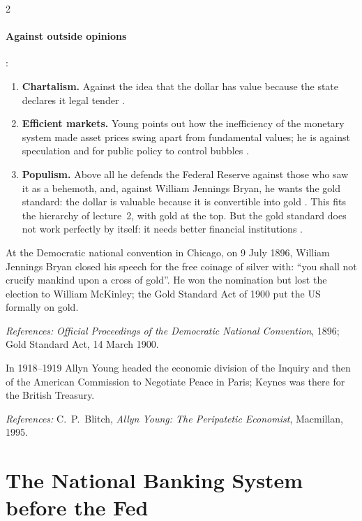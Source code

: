 \begin{paracol}{2}
\paragraph{Against outside opinions} :
\begin{enumerate}[resume]
  \item \textbf{Chartalism.} Against the idea that the dollar has value because the state declares it legal tender
        .
  \item \textbf{Efficient markets.} Young points out how the inefficiency of the monetary system made asset prices swing apart from
        fundamental values; he is against speculation and for public policy to control bubbles .
  \item \textbf{Populism.} Above all he defends the Federal Reserve against those who saw it as a behemoth, and, against William
        Jennings Bryan, he wants the gold standard: the dollar is valuable because it is convertible into gold
        . This fits the hierarchy of lecture~2, with gold at the top. But the gold
        standard does not work perfectly by itself: it needs better financial institutions .
\end{enumerate}\Needspace*{10.5cm}\begin{history}
At the Democratic national convention in Chicago, on 9 July 1896, William Jennings Bryan closed his speech for the free coinage
of silver with: ``you shall not crucify mankind upon a cross of gold''. He won the nomination but lost the election to William
McKinley; the Gold Standard Act of 1900 put the US formally on gold.\par
\emph{References:} \emph{Official Proceedings of the Democratic National Convention}, 1896; Gold Standard Act, 14 March 1900.
\end{history}\begin{history}
In 1918--1919 Allyn Young headed the economic division of the Inquiry and then of the American Commission to Negotiate Peace
in Paris; Keynes was there for the British Treasury.\par
\emph{References:} C.~P.~Blitch, \emph{Allyn Young: The Peripatetic Economist}, Macmillan, 1995.
\end{history}

\section{The National Banking System before the Fed}\label{sec:st-nbs}


\end{paracol}
